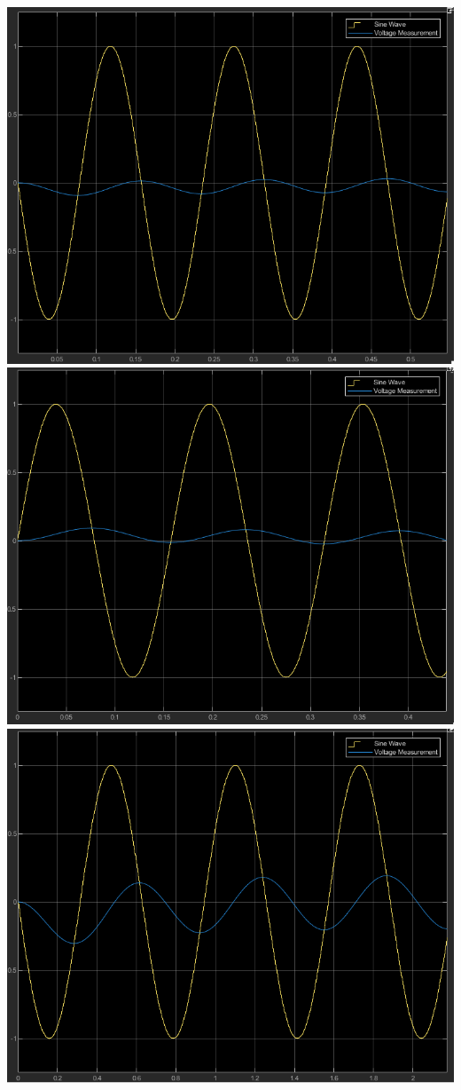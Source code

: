 \documentclass{scrartcl}
\begin{document}
\includegraphics[scale=0.4]{lowpass_sim_out2.png}
\includegraphics[scale=0.4]{lowpass_sim_out22.png}\\
\includegraphics[scale=0.4]{lowpass_sim_out3.png}
\end{document}
